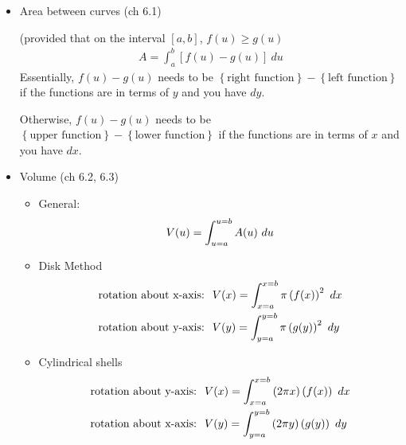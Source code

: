 \documentclass{report}
\begin{document}
\newpage




\setlength{\columnsep}{3cm}
\begin{multicols}{2}
\setlength{\columnseprule}{.4pt}

\begin{itemize}[leftmargin=.25cm]
\item Area between curves (ch 6.1)

(provided that on the interval $[a,b]$, $ f(u) \geq g(u) $
\begin{align*}
A = \int_a^b [ f(u) - g(u) ] \ du
\end{align*}
Essentially, $ f(u) - g(u) $ needs to be $ \left\{ \textrm{right function} \right\} - \left\{ \textrm{left function} \right\} $ if the functions are in terms of $ y $ and you have $ dy $.

Otherwise, $ f(u) - g(u) $ needs to be $ \left\{ \textrm{upper function} \right\} - \left\{ \textrm{lower function} \right\} $ if the functions are in terms of $ x $ and you have $ dx $.




\item Volume (ch 6.2, 6.3)
\begin{itemize}[leftmargin=.25cm]
\item General:
\begin{align*} 
V(u) = \int_{u=a}^{u=b} A(u) \ du \hfill \\
\end{align*}

\item Disk Method
\begin{align*}
&\textrm{rotation about x-axis:} \hspace{0.25cm} V(x) = \int_{x=a}^{x=b} \pi \left( f(x) \right)^2 \ dx \hfill \\
&\textrm{rotation about y-axis:} \hspace{0.25cm} V(y) = \int_{y=a}^{y=b} \pi \left( g(y) \right)^2 \ dy \hfill \\
\end{align*}

\item Cylindrical shells
\begin{align*}
&\textrm{rotation about y-axis:} \hspace{0.25cm} V(x) = \int_{x=a}^{x=b} \left( 2 \pi x \right) \left( f(x) \right) \ dx \\
&\textrm{rotation about x-axis:} \hspace{0.25cm} V(y) = \int_{y=a}^{y=b} \left( 2 \pi y \right) \left( g(y) \right) \ dy
\end{align*}
\end{itemize}





\end{itemize}
\end{multicols}
\end{document}
